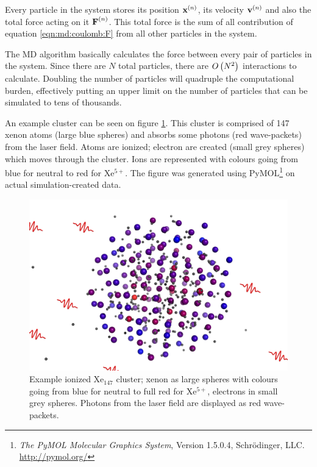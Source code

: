Every particle in the system stores its position $\textbf{x}^{\left( n \right)}$, its velocity
$\textbf{v}^{\left( n \right)}$ and also the total force acting on it $\textbf{F}^{\left( n \right)}$. This total
force is the sum of all contribution of equation \eqref{eqn:md:coulomb:F} from
all other particles in the system.

The MD algorithm basically calculates the force between every pair of particles
in the system. Since there are $N$ total particles, there are $O\left( N^2 \right)$
interactions to calculate. Doubling the number of particles will quadruple the
computational burden, effectively putting an upper limit on the number of
particles that can be simulated to tens of thousands.

An example cluster can be seen on figure \ref{fig:md:cluster}.
This cluster is comprised
of 147 xenon atoms (large blue spheres) and absorbs some photons (red
wave-packets) from the laser field. Atoms are ionized; electron are created
(small grey spheres) which moves through the cluster. Ions are represented with
colours going from blue for neutral to red for Xe$^{5+}$. The figure was
generated using
PyMOL\footnote{\textit{The PyMOL Molecular Graphics System}, Version 1.5.0.4,
Schrödinger, LLC. \url{http://pymol.org/}} on actual simulation-created data.


\begin{figure}
 \centering
 \includegraphics[width=\figurewidth]{figures/cluster}
 \caption{\label{fig:md:cluster}Example ionized Xe$_{147}$ cluster; xenon as
          large spheres with colours going from blue for neutral to full red for
          Xe$^{5+}$, electrons in small grey spheres. Photons from the laser
          field are displayed as red wave-packets.}
\end{figure}



